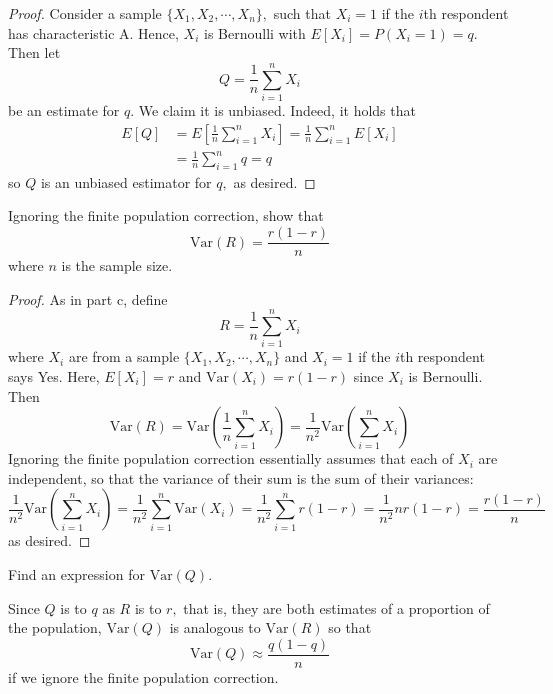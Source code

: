 \documentclass{article}
\newcommand{\var}{\mathrm{Var}}
\begin{document}
\begin{itemize}
\begin{enumerate}[a.]
\begin{proof}
				Consider a sample $\{X_1, X_2, \cdots, X_n\},$ such that $X_i=1$ if the $i$th respondent has characteristic A. Hence, $X_i$ is Bernoulli with $E[X_i]=P(X_i=1)=q.$  Then let \[Q=\frac{1}{n}\sum_{i=1}^n X_i\] be an estimate for $q.$ We claim it is unbiased. Indeed, it holds that
				\begin{align*}
					E[Q] &= E\left[ \frac{1}{n}\sum_{i=1}^n X_i \right] = \frac{1}{n}\sum_{i=1}^n E[X_i] \\
					&= \frac{1}{n}\sum_{i=1}^n q = q
				\end{align*} so $Q$ is an unbiased estimator for $q,$ as desired.

			\end{proof}

			\ii Ignoring the finite population correction, show that \[ \var(R)=\frac{r(1-r)}{n}\] where $n$ is the sample size.
			\begin{proof}
				As in part c, define \[R=\frac{1}{n}\sum_{i=1}^n X_i\] where $X_i$ are from a sample $\{X_1, X_2, \cdots, X_n\}$ and $X_i=1$ if the $i$th respondent says Yes. Here, $E[X_i]=r$ and $\var(X_i)=r(1-r)$ since $X_i$ is Bernoulli. Then \[\var(R) = \var\left( \frac{1}{n}\sum_{i=1}^n X_i\right) = \frac{1}{n^2}\var\left( \sum_{i=1}^n X_i \right) \] Ignoring the finite population correction essentially assumes that each of $X_i$ are independent, so that the variance of their sum is the sum of their variances: \[\frac{1}{n^2}\var\left( \sum_{i=1}^n X_i \right) = \frac{1}{n^2}\sum_{i=1}^n \var(X_i) = \frac{1}{n^2}\sum_{i=1}^n r(1-r) = \frac{1}{n^2} nr(1-r) = \frac{r(1-r)}{n}\] as desired.
				
			\end{proof}

			\ii Find an expression for $\var(Q).$
			\begin{soln}
				Since $Q$ is to $q$ as $R$ is to $r,$ that is, they are both estimates of a proportion of the population, $\var(Q)$ is analogous to $\var(R)$ so that \[\var(Q)\approx\boxed{\frac{q(1-q)}{n}}\] if we ignore the finite population correction. 
				
			\end{soln}
			
		\end{enumerate}
		

	\newpage


\end{itemize}
\end{document}
